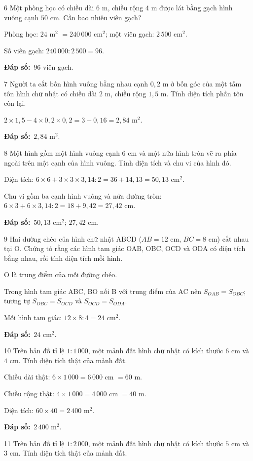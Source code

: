 \documentclass[11pt]{article}
\newif\ifsol \solfalse
\providecommand{\AnsWord}{Đáp số}
\newcommand{\dapso}[1]{\par\textbf{\AnsWord:}\ #1}
\newcommand{\probsol}[1]{%
  \begin{lrbox}{\solmeasure}\begin{minipage}{\dimexpr\linewidth-24pt\relax}#1\end{minipage}\end{lrbox}%
  \ifsol
    \begin{solbox}#1\end{solbox}%
  \else
    \setlength{\solht}{\dimexpr\ht\solmeasure+\dp\solmeasure+0.85cm\relax}%
    \ifdim\solht<1.35cm\setlength{\solht}{1.35cm}\fi
    \begin{tcolorbox}[colback=white,colframe=Line,boxrule=0.8pt,arc=5pt,
      left=8pt,right=8pt,top=4pt,bottom=4pt,height=\solht]{\footnotesize\color{Slate}\itshape\WorkWord}\end{tcolorbox}%
  \fi}
\newcommand{\gap}{\vspace{0.3cm}}
\def\WorkWord{Bài làm:}
\def\AnsWord{Đáp số}
\begin{document}
\gap
\begin{probbox}{6}{\relax}
Một phòng học có chiều dài $6$ m, chiều rộng $4$ m được lát bằng gạch hình vuông cạnh $50$ cm. Cần bao nhiêu viên gạch?
\end{probbox}
\probsol{
Phòng học: $24$ m$^2$ $=240\,000$ cm$^2$; một viên gạch: $2\,500$ cm$^2$.\par Số viên gạch: $240\,000:2\,500=96$.
\dapso{$96$ viên gạch.}}
\gap
\begin{probbox}{7}{\relax}
Người ta cắt bốn hình vuông bằng nhau cạnh $0{,}2$ m ở bốn góc của một tấm tôn hình chữ nhật có chiều dài $2$ m, chiều rộng $1{,}5$ m. Tính diện tích phần tôn còn lại.
\end{probbox}
\probsol{
$2\times1{,}5-4\times0{,}2\times0{,}2=3-0{,}16=2{,}84$ m$^2$.
\dapso{$2{,}84$ m$^2$.}}
\gap
\begin{probbox}{8}{\relax}
Một hình gồm một hình vuông cạnh $6$ cm và một nửa hình tròn vẽ ra phía ngoài trên một cạnh của hình vuông. Tính diện tích và chu vi của hình đó.
\end{probbox}
\probsol{
Diện tích: $6\times6+3\times3\times3{,}14:2=36+14{,}13=50{,}13$ cm$^2$.\par
Chu vi gồm ba cạnh hình vuông và nửa đường tròn: $6\times3+6\times3{,}14:2=18+9{,}42=27{,}42$ cm.
\dapso{$50{,}13$ cm$^2$; $27{,}42$ cm.}}
\gap
\begin{probbox}{9}{\relax}
Hai đường chéo của hình chữ nhật ABCD ($AB=12$ cm, $BC=8$ cm) cắt nhau tại O. Chứng tỏ rằng các hình tam giác OAB, OBC, OCD và ODA có diện tích bằng nhau, rồi tính diện tích mỗi hình.
\end{probbox}
\probsol{
O là trung điểm của mỗi đường chéo.\par Trong hình tam giác ABC, BO nối B với trung điểm của AC nên $S_{OAB}=S_{OBC}$; tương tự $S_{OBC}=S_{OCD}$ và $S_{OCD}=S_{ODA}$.\par
Mỗi hình tam giác: $12\times8:4=24$ cm$^2$.
\dapso{$24$ cm$^2$.}}
\gap
\begin{probbox}{10}{\relax}
Trên bản đồ tỉ lệ $1:1\,000$, một mảnh đất hình chữ nhật có kích thước $6$ cm và $4$ cm. Tính diện tích thật của mảnh đất.
\end{probbox}
\probsol{
Chiều dài thật: $6\times1\,000=6\,000$ cm $=60$ m.\par Chiều rộng thật: $4\times1\,000=4\,000$ cm $=40$ m.\par Diện tích: $60\times40=2\,400$ m$^2$.
\dapso{$2\,400$ m$^2$.}}
\gap
\begin{probbox}{11}{\relax}
Trên bản đồ tỉ lệ $1:2\,000$, một mảnh đất hình chữ nhật có kích thước $5$ cm và $3$ cm. Tính diện tích thật của mảnh đất.
\end{probbox}
\end{document}
